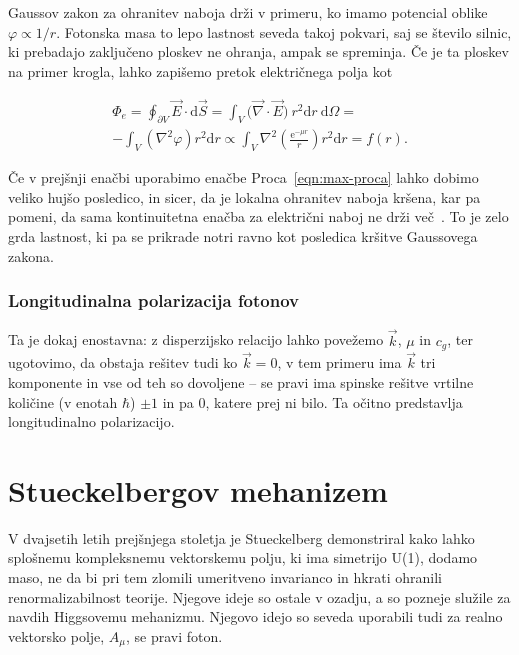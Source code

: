 \documentclass[a4paper, twocolumn, titlepage]{article}
\renewcommand{\div}{
	\ensuremath{\vec{\nabla}\cdot}
}
\newcommand{\ve}{
	\ensuremath{\vec{E}}
}
\renewcommand{\d}{
	\ensuremath{\mathrm{d}}
}
\begin{document}
Gaussov zakon za ohranitev naboja dr\v zi v primeru, ko imamo potencial oblike $\varphi \propto 1/r$. Fotonska masa to
lepo lastnost seveda takoj pokvari, saj se \v stevilo silnic, ki prebadajo zaklju\v ceno ploskev ne ohranja, ampak se
spreminja. \v Ce je ta ploskev na primer krogla, lahko zapi\v semo pretok elektri\v cnega polja kot

\begin{multline*}
	\Phi_e = \oint_{\partial V} \ve \cdot \d \vec{S} = \int_V \big(\div \ve\big)\ r^2\d r\ \d\Omega =\\
		- \int_V (\nabla^2\varphi) r^2 \d r \propto \int_V \nabla^2 \left(\frac{\text{e}^{-\mu r}}{r}\right)r^2 \d
		r = f(r).
\end{multline*}

\v Ce v prej\v snji ena\v cbi uporabimo ena\v cbe Proca~\eqref{eqn:max-proca} lahko dobimo veliko huj\v so posledico, in
sicer, da je lokalna ohranitev naboja kr\v sena, kar pa pomeni, da sama kontinuitetna ena\v cba za elektri\v cni naboj ne
dr\v zi ve\v c~\cite{nieto2}. To je zelo grda lastnost, ki pa se prikrade notri ravno kot posledica kr\v sitve Gaussovega zakona.

\subsubsection{Longitudinalna polarizacija fotonov}

Ta je dokaj enostavna: z disperzijsko relacijo lahko pove\v zemo $\vec{k}$, $\mu$ in $c_g$, ter ugotovimo, da obstaja
re\v sitev tudi ko $\vec{k} = 0$, v tem primeru ima $\vec{k}$ tri komponente in vse od teh so dovoljene -- se pravi ima
spinske re\v sitve vrtilne koli\v cine (v enotah $\hbar$) $\pm 1$ in pa $0$, katere prej ni bilo. Ta o\v citno predstavlja
longitudinalno polarizacijo.

\section{Stueckelbergov mehanizem}

V dvajsetih letih prej\v snjega stoletja je Stueckelberg demonstriral kako lahko splo\v snemu kompleksnemu vektorskemu
polju, ki ima simetrijo U(1), dodamo maso, ne da bi pri tem zlomili umeritveno invarianco in hkrati ohranili
renormalizabilnost teorije. Njegove ideje so ostale v ozadju, a so pozneje slu\v zile za navdih Higgsovemu mehanizmu.
Njegovo idejo so seveda uporabili tudi za realno vektorsko polje, $A_\mu$, se pravi foton.
\end{document}
